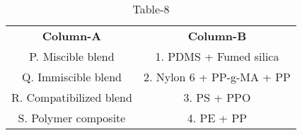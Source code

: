 \begin{table}[htbp]
  \centering
  \caption{Table-8}
  \label{tab:tables/table8.tex}
  \begin{tabular}{cc}
\textbf{Column-A} & \textbf{Column-B}\\

P. Miscible blend & 1. PDMS + Fumed silica \\
Q. Immiscible blend & 2. Nylon 6 + PP-g-MA + PP \\
R. Compatibilized blend & 3. PS + PPO \\
S. Polymer composite & 4. PE + PP\\
  
  
  
  \end{tabular}
\end{table}